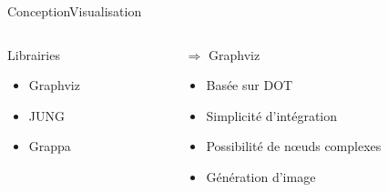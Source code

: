 \begin{frame}{Conception}{Visualisation}
\begin{columns}[t]
\begin{column}{0.4\textwidth}
	\begin{block}{Librairies}
		\begin{itemize}
		\item Graphviz
		\item JUNG
		\item Grappa
		\end{itemize}
	\end{block}
\end{column}
\pause
\begin{column}{0.6\textwidth}
	\begin{exampleblock}{$\Rightarrow$ Graphviz}
		\begin{itemize}
		\item Basée sur DOT
		\item Simplicité d'intégration
		\item Possibilité de nœuds complexes
		\item Génération d'image
		\end{itemize}
	\end{exampleblock}
\end{column}
\end{columns}
\end{frame}